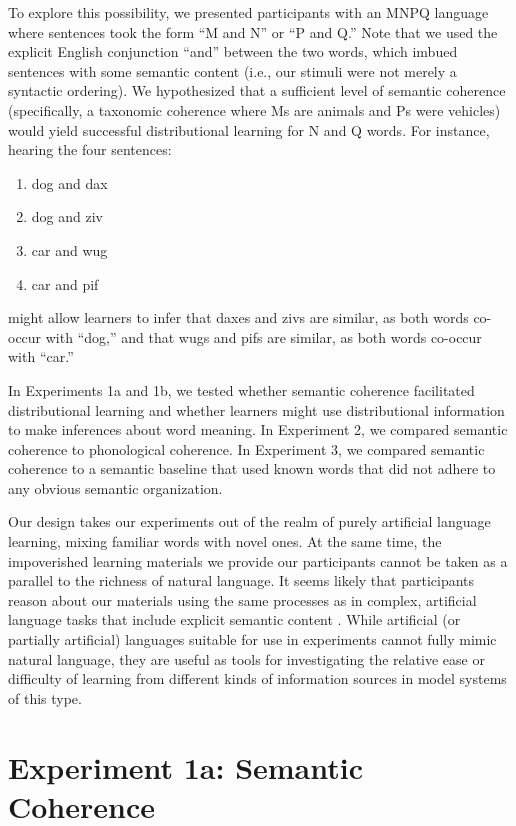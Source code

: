 \documentclass[man,longtable,floatsintext]{my-apa6}
\begin{document}
To explore this possibility, we presented participants with an MNPQ language where sentences took the form ``M and N'' or ``P and Q.'' Note that we used the explicit English conjunction ``and'' between the two words, which imbued sentences with some semantic content (i.e., our stimuli were not merely a syntactic ordering). We hypothesized that a sufficient level of semantic coherence (specifically, a taxonomic coherence where Ms are animals and Ps were vehicles) would yield successful distributional learning for N and Q words. For instance, hearing the four sentences:

\begin{enumerate}
\item dog and dax
\item dog and ziv
\item car and wug
\item car and pif
\end{enumerate}

\noindent might allow learners to infer that daxes and zivs are similar, as both words co-occur with ``dog,'' and that wugs and pifs are similar, as both words co-occur with ``car.''

In Experiments 1a and 1b, we tested whether semantic coherence facilitated distributional learning and whether learners might use distributional information to make inferences about word meaning. In Experiment 2, we compared semantic coherence to phonological coherence. In Experiment 3, we compared semantic coherence to a semantic baseline that used known words that did not adhere to any obvious semantic organization.

Our design takes our experiments out of the realm of purely artificial language learning, mixing familiar words with novel ones.
At the same time, the impoverished learning materials we provide our participants cannot be taken as a parallel to the richness of natural language.
It seems likely that participants reason about our materials using the same processes as in complex, artificial language tasks that include explicit semantic content \citep{braine1987}.
While artificial (or partially artificial) languages suitable for use in experiments cannot fully mimic natural language, they are useful as tools for investigating the relative ease or difficulty of learning from different kinds of information sources in model systems of this type.


\section{Experiment 1a: Semantic Coherence}
\end{document}
